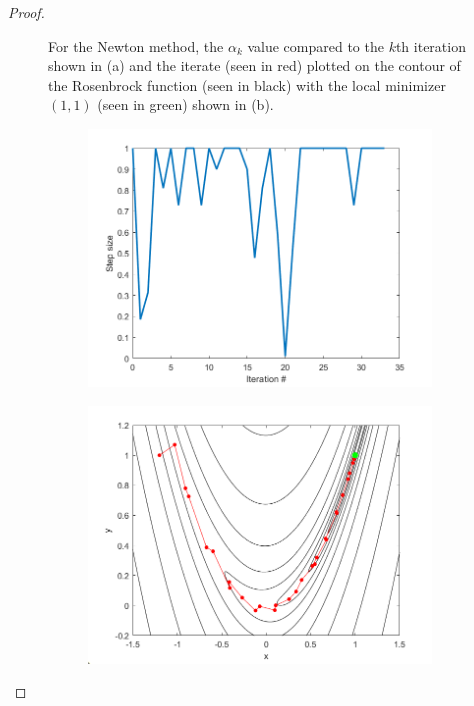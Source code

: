 \documentclass[12pt]{report}
\begin{document}
\begin{problem}
\begin{proof}
\begin{figure}[H]
\begin{subfigure}[b]{0.5\linewidth}
                \caption{}
                \label{fig4-2:b}
                \vspace{4ex}
            \end{subfigure}
            \caption{For the Newton method, the $\alpha_k$ value compared to the $k$th iteration shown in (a) and the iterate (seen in red) plotted on the contour of the Rosenbrock function (seen in black) with the local minimizer $(1,1)$ (seen in green) shown in (b).}
            \label{fig4-2}
        \end{figure}
        \begin{figure}[H]
        \begin{subfigure}[b]{0.5\linewidth}
            \centering
            \includegraphics[width=\linewidth]{images/4-3-alpha.png}
            \caption{}
            \label{fig4-3:a}
            \vspace{4ex}
        \end{subfigure}%
        \begin{subfigure}[b]{0.5\linewidth}
            \centering
            \includegraphics[width=\linewidth]{images/4-3-contour.png}

\end{subfigure}
\end{figure}
\end{proof}
\end{problem}
\end{document}
